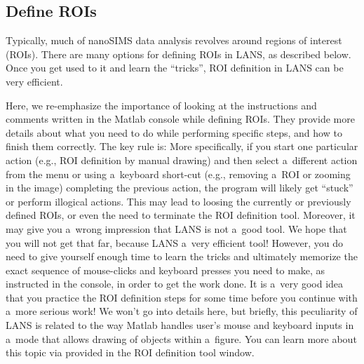 \subsection{Define ROIs}
\setcounter{step}{0}

\goldbox{}
Typically, much of nanoSIMS data analysis revolves around regions of interest (ROIs). There are many options for defining ROIs in LANS, as described below. Once you get used to it and learn the ``tricks'', ROI definition in LANS can be very efficient. 
\tcbe

Here, we re-emphasize the importance of looking at the instructions and comments written in the Matlab console while defining ROIs. They provide more details about what  you need to do while performing specific steps, and how to finish them correctly. The key rule is: \textcolor{red}{} More specifically, if you start one particular action (e.g., ROI definition by manual drawing) and then select a~different action from the menu or using a~keyboard short-cut (e.g., removing a~ROI or zooming in the image)  completing the previous action, the program will likely get ``stuck'' or perform illogical actions. This may lead to loosing the currently or previously defined ROIs, or even the need to terminate the ROI definition tool. Moreover, it may give you a~wrong impression that LANS is not a~good tool. We hope that you will not get that far, because LANS  a~very efficient tool! However, you do need to give yourself enough time to learn the tricks and ultimately memorize the exact sequence of mouse-clicks and keyboard presses you need to make, as instructed in the console, in order to get the work done. It is a~very good idea that you practice the ROI definition steps for some time before you continue with a~more serious work!  We won't go into details here, but briefly, this peculiarity of LANS is related to the way Matlab handles user's mouse and keyboard inputs in a~mode that allows drawing of objects within a~figure. You can learn more about this topic via  provided in the ROI definition tool window.
\tcbe




